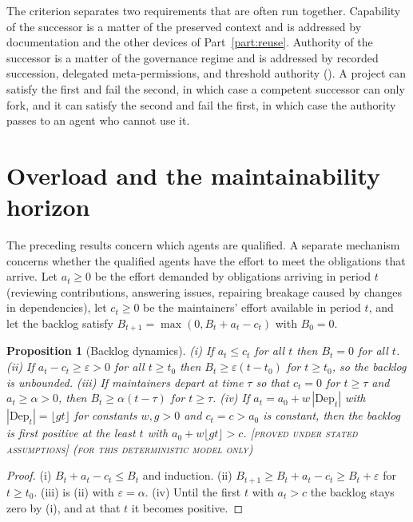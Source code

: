 \documentclass[11pt,twoside,openright]{book}
\theoremstyle{plain}
\newtheorem{proposition}[theorem]{Proposition}
\theoremstyle{definition}
\theoremstyle{remark}
\newcommand{\Proved}{\textup{\textsc{[proved under stated assumptions]}}}
\begin{document}
The criterion separates two requirements that are often run together. Capability of the successor is a matter of the preserved context and is addressed by documentation and the other devices of Part~\ref{part:reuse}. Authority of the successor is a matter of the governance regime and is addressed by recorded succession, delegated meta-permissions, and threshold authority (). A project can satisfy the first and fail the second, in which case a competent successor can only fork, and it can satisfy the second and fail the first, in which case the authority passes to an agent who cannot use it.

\section{Overload and the maintainability horizon}

The preceding results concern which agents are qualified. A separate mechanism concerns whether the qualified agents have the effort to meet the obligations that arrive. Let $a_t\ge0$ be the effort demanded by obligations arriving in period $t$ (reviewing contributions, answering issues, repairing breakage caused by changes in dependencies), let $c_t\ge0$ be the maintainers' effort available in period $t$, and let the backlog satisfy $B_{t+1}=\max(0,B_t+a_t-c_t)$ with $B_0=0$.

\begin{proposition}[Backlog dynamics]\label{prop:overload}
(i) If $a_t\le c_t$ for all $t$ then $B_t=0$ for all $t$. (ii) If $a_t-c_t\ge\varepsilon>0$ for all $t\ge t_0$ then $B_t\ge\varepsilon(t-t_0)$ for $t\ge t_0$, so the backlog is unbounded. (iii) If maintainers depart at time $\tau$ so that $c_t=0$ for $t\ge\tau$ and $a_t\ge\alpha>0$, then $B_t\ge\alpha(t-\tau)$ for $t\ge\tau$. (iv) If $a_t=a_0+w\,|\mathrm{Dep}_t|$ with $|\mathrm{Dep}_t|=\lfloor gt\rfloor$ for constants $w,g>0$ and $c_t=c>a_0$ is constant, then the backlog is first positive at the least $t$ with $a_0+w\lfloor gt\rfloor>c$.
\Proved{} \textsc{(for this deterministic model only)}
\end{proposition}

\begin{proof}
(i) $B_t+a_t-c_t\le B_t$ and induction. (ii) $B_{t+1}\ge B_t+a_t-c_t\ge B_t+\varepsilon$ for $t\ge t_0$. (iii) is (ii) with $\varepsilon=\alpha$. (iv) Until the first $t$ with $a_t>c$ the backlog stays zero by (i), and at that $t$ it becomes positive.
\end{proof}
\end{document}
